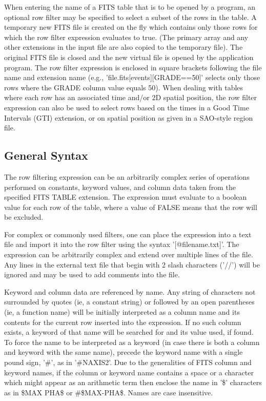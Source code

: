 \documentclass[11pt]{book}
\begin{document}
    When entering the name of a FITS table that is to be opened by a
    program, an optional row filter may be specified to select a subset
    of the rows in the table.  A temporary new FITS file is created on
    the fly which contains only those rows for which the row filter
    expression evaluates to true.  (The primary array and any other
    extensions in the input file are also copied to the temporary
    file).  The original FITS file is closed and the new virtual file
    is opened by the application program.  The row filter expression is
    enclosed in square brackets following the file name and extension
    name (e.g., 'file.fits[events][GRADE==50]'  selects only those rows
    where the GRADE column value equals 50).   When dealing with tables
    where each row has an associated time and/or 2D spatial position,
    the row filter expression can also be used to select rows based on
    the times in a Good Time Intervals (GTI) extension, or on spatial
    position as given in a SAO-style region file.


\subsection{General Syntax}

    The row filtering  expression can be an arbitrarily  complex series
    of operations performed  on constants,  keyword values,  and column
    data taken from the specified FITS TABLE extension.  The expression
    must evaluate to a boolean  value for each row  of the table, where
    a value of FALSE means that the row will be excluded.

    For complex or commonly  used filters, one can place the expression
    into a text file and import it into the row filter using the syntax
    '[@filename.txt]'.  The expression can be  arbitrarily complex and
    extend over multiple lines of the file.  Any lines in the external
    text file that begin with 2 slash characters ('//') will be ignored
    and may be used to add comments into the file.

    Keyword and   column data  are referenced by   name.  Any  string of
    characters not surrounded by    quotes (ie, a constant  string)   or
    followed by   an open parentheses (ie,   a  function name)   will be
    initially interpreted   as a column  name and  its contents for the
    current row inserted into the expression.  If no such column exists,
    a keyword of that  name will be searched for  and its value used, if
    found.  To force the  name to be  interpreted as a keyword (in case
    there is both a column and keyword with the  same name), precede the
    keyword name with a single pound sign, '\#', as in '\#NAXIS2'.  Due to
    the generalities of FITS column and  keyword names, if the column or
    keyword name  contains a space or a  character which might appear as
    an arithmetic  term then enclose  the  name in '\$'  characters as in
    \$MAX PHA\$ or \#\$MAX-PHA\$.  Names are case insensitive.
\end{document}
